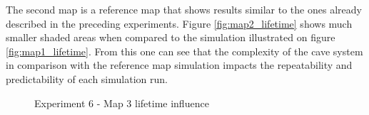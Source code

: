 The second map is a reference map that shows results similar to the ones already described in the preceding experiments.
Figure \ref{fig:map2_lifetime} shows much smaller shaded areas when compared to the simulation illustrated on figure \ref{fig:map1_lifetime}.
From this one can see that the complexity of the cave system in comparison with the reference map simulation impacts the repeatability and predictability of each simulation run.

\begin{figure}[H]
    \centering

    \hspace*{\fill}

    \hspace*{\fill}

    \caption{Experiment 6 - Map 3 lifetime influence}\label{fig:map3_lifetime}
\end{figure}

